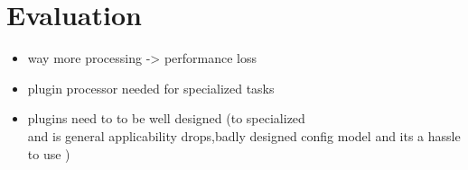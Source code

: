 \chapter{Evaluation}


\begin{itemize}
  \item way more processing -> performance loss
  \item plugin processor needed for specialized tasks
  \item plugins need to to be well designed (to specialized\\
        and is general applicability drops,badly designed config model and its a hassle to use )
\end{itemize}

